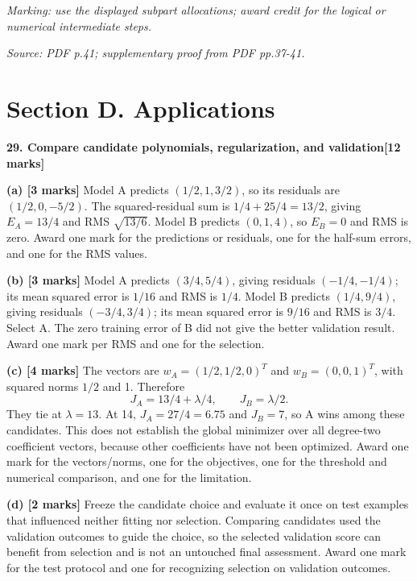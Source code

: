 \documentclass[11pt,a4paper]{article}
\begin{document}
\textit{Marking: use the displayed subpart allocations; award credit for the logical or numerical intermediate steps.}\par
{\footnotesize\textit{Source: PDF p.41; supplementary proof from PDF pp.37-41.}}
\newpage\section*{Section D. Applications}
\textbf{29. Compare candidate polynomials, regularization, and validation}\hfill\textbf{[12 marks]}\par\medskip
\textbf{(a) [3 marks]} Model A predicts \((1/2,1,3/2)\), so its residuals are \((1/2,0,-5/2)\). The squared-residual sum is \(1/4+25/4=13/2\), giving \(E_A=13/4\) and RMS \(\sqrt{13/6}\). Model B predicts \((0,1,4)\), so \(E_B=0\) and RMS is zero. Award one mark for the predictions or residuals, one for the half-sum errors, and one for the RMS values.

\textbf{(b) [3 marks]} Model A predicts \((3/4,5/4)\), giving residuals \((-1/4,-1/4)\); its mean squared error is \(1/16\) and RMS is \(1/4\). Model B predicts \((1/4,9/4)\), giving residuals \((-3/4,3/4)\); its mean squared error is \(9/16\) and RMS is \(3/4\). Select A. The zero training error of B did not give the better validation result. Award one mark per RMS and one for the selection.

\textbf{(c) [4 marks]} The vectors are \(w_A=(1/2,1/2,0)^T\) and \(w_B=(0,0,1)^T\), with squared norms \(1/2\) and 1. Therefore \[J_A=13/4+\lambda/4,\qquad J_B=\lambda/2.\] They tie at \(\lambda=13\). At 14, \(J_A=27/4=6.75\) and \(J_B=7\), so A wins among these candidates. This does not establish the global minimizer over all degree-two coefficient vectors, because other coefficients have not been optimized. Award one mark for the vectors/norms, one for the objectives, one for the threshold and numerical comparison, and one for the limitation.

\textbf{(d) [2 marks]} Freeze the candidate choice and evaluate it once on test examples that influenced neither fitting nor selection. Comparing candidates used the validation outcomes to guide the choice, so the selected validation score can benefit from selection and is not an untouched final assessment. Award one mark for the test protocol and one for recognizing selection on validation outcomes.
\end{document}
